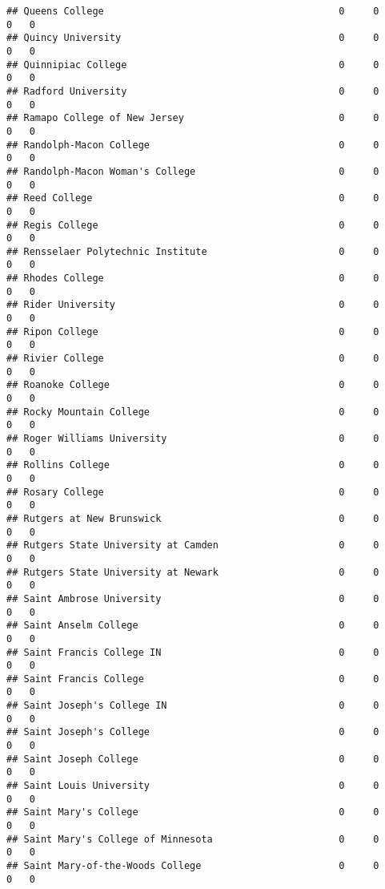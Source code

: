 \documentclass[
]{article}
\begin{document}
\begin{verbatim}
## Queens College                                         0     0        0   0
## Quincy University                                      0     0        0   0
## Quinnipiac College                                     0     0        0   0
## Radford University                                     0     0        0   0
## Ramapo College of New Jersey                           0     0        0   0
## Randolph-Macon College                                 0     0        0   0
## Randolph-Macon Woman's College                         0     0        0   0
## Reed College                                           0     0        0   0
## Regis College                                          0     0        0   0
## Rensselaer Polytechnic Institute                       0     0        0   0
## Rhodes College                                         0     0        0   0
## Rider University                                       0     0        0   0
## Ripon College                                          0     0        0   0
## Rivier College                                         0     0        0   0
## Roanoke College                                        0     0        0   0
## Rocky Mountain College                                 0     0        0   0
## Roger Williams University                              0     0        0   0
## Rollins College                                        0     0        0   0
## Rosary College                                         0     0        0   0
## Rutgers at New Brunswick                               0     0        0   0
## Rutgers State University at Camden                     0     0        0   0
## Rutgers State University at Newark                     0     0        0   0
## Saint Ambrose University                               0     0        0   0
## Saint Anselm College                                   0     0        0   0
## Saint Francis College IN                               0     0        0   0
## Saint Francis College                                  0     0        0   0
## Saint Joseph's College IN                              0     0        0   0
## Saint Joseph's College                                 0     0        0   0
## Saint Joseph College                                   0     0        0   0
## Saint Louis University                                 0     0        0   0
## Saint Mary's College                                   0     0        0   0
## Saint Mary's College of Minnesota                      0     0        0   0
## Saint Mary-of-the-Woods College                        0     0        0   0

\end{verbatim}
\end{document}
